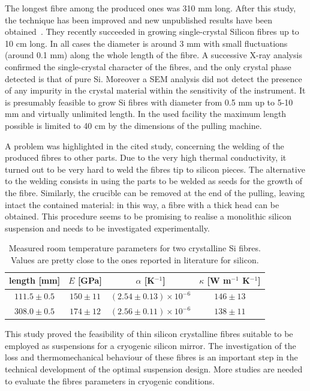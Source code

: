 The longest fibre among the produced ones was 310 mm long.
After this study, the technique has been improved and new
unpublished results have been obtained~\cite{toncellipers}.
They recently succeeded in growing single-crystal Silicon
fibres up to 10 cm long. In all cases the diameter is around 3
mm with small fluctuations (around 0.1 mm) along the whole
length of the fibre. A successive X-ray analysis confirmed the
single-crystal character of the fibres, and the only crystal
phase detected is that of pure Si. Moreover a SEM analysis did
not detect the presence of any impurity in the crystal material
within the sensitivity of the instrument. It is presumably
feasible to grow Si fibres with diameter from 0.5 mm up to 5-10
mm and virtually unlimited length. In the used facility the
maximum length possible is limited to 40 cm by the dimensions
of the pulling machine.


A problem was highlighted in the cited study, concerning the
welding of the produced fibres to other parts. Due to the very
high thermal conductivity, it turned out to be very hard to
weld the fibres tip to silicon pieces. The alternative to the
welding consists in using the parts to be welded as seeds for
the growth of the fibre. Similarly, the crucible can be removed
at the end of the pulling, leaving intact the contained
material: in this way, a fibre with a thick head can be
obtained. This procedure seems to be promising to realise a
monolithic silicon suspension and needs to be investigated
experimentally.



\begin{table}
\begin{center}
\end{center}
  \caption{Measured room temperature parameters for two crystalline Si fibres. Values are pretty close to the ones reported in literature for  silicon.}
  \label{table1}
  \begin{tabular}{cccc}
    \hline
    length [mm]& $E$ [GPa] & $\alpha$ [K$^{-1}$] & $\kappa$ [W m$^{-1}$ K$^{-1}$] \\
    \hline
    $111.5\pm0.5$ & $150\pm11$ & $(2.54\pm0.13)\times10^{-6}$ & $146\pm13$ \\
    $308.0\pm0.5$ & $174\pm12$ & $(2.56\pm0.11)\times10^{-6}$ & $138\pm11$ \\
    \hline
  \end{tabular}
\end{table}


This study proved the feasibility of thin silicon crystalline
fibres suitable to be employed as suspensions for a cryogenic
silicon mirror. The investigation of the loss and
thermomechanical behaviour of these fibres is an important step
in the technical development of the optimal suspension design.
More studies are needed to evaluate the fibres parameters in
cryogenic conditions.

